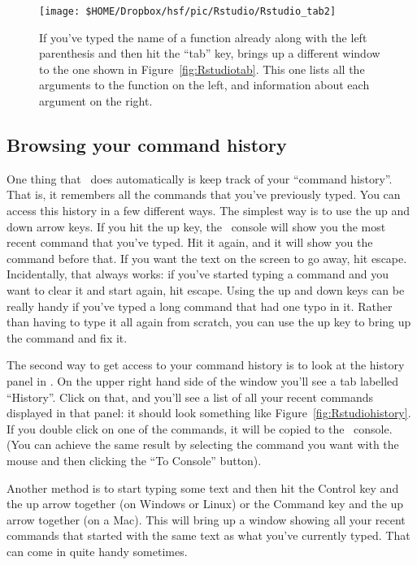 \begin{figure}[t]
\begin{center}
		\texttt{[image: \$HOME/Dropbox/hsf/pic/Rstudio/Rstudio\_tab2]}
\caption{If you've typed the name of a function already along with the left parenthesis and then hit the ``tab'' key, \Rstudio brings up a different window to the one shown in Figure~\protect\ref{fig:Rstudiotab}. This one lists all the arguments to the function on the left, and information about each argument on the right.}
\label{fig:Rstudiotab2}
\end{center}
\end{figure}


\subsection{Browsing your command history}

One thing that \R\ does automatically is keep track of your ``command history''. That is, it remembers all the commands that you've previously typed. You can access this history in a few different ways. The simplest way is to use the up and down arrow keys. If you hit the up key, the \R\ console will show you the most recent command that you've typed. Hit it again, and it will show you the command before that. If you want the text on the screen to go away, hit escape. Incidentally, that always works: if you've started typing a command and you want to clear it and start again, hit escape. Using the up and down keys can be really handy if you've typed a long command that had one typo in it. Rather than having to type it all again from scratch, you can use the up key to bring up the command and fix it. 

The second way to get access to your command history is to look at the history panel in \Rstudio. On the upper right hand side of the \Rstudio window you'll see a tab labelled ``History''. Click on that, and you'll see a list of all your recent commands displayed in that panel: it should look something like Figure~\ref{fig:Rstudiohistory}. If you double click on one of the commands, it will be copied to the \R\ console. (You can achieve the same result by selecting the command you want with the mouse and then clicking the ``To Console'' button). 

Another method is to start typing some text and then hit the Control key and the up arrow together (on Windows or Linux) or the Command key and the up arrow together (on a Mac). This will bring up a window showing all your recent commands that started with the same text as what you've currently typed. That can come in quite handy sometimes.

